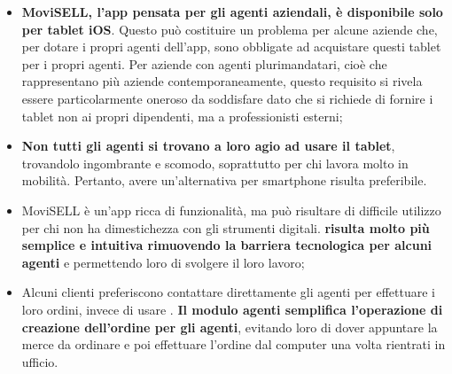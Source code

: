 \begin{itemize}
    \item \textbf{MoviSELL, l'app pensata per gli agenti aziendali, è disponibile solo per tablet iOS}. Questo può costituire un problema 
          per alcune aziende che, per dotare i propri agenti dell'app, sono obbligate ad acquistare questi tablet per i propri agenti. 
          Per aziende con agenti plurimandatari, cioè che rappresentano più aziende contemporaneamente, questo requisito si 
          rivela essere particolarmente oneroso da soddisfare dato che si richiede di fornire i tablet non ai propri dipendenti, 
          ma a professionisti esterni;
    \item \textbf{Non tutti gli agenti si trovano a loro agio ad usare il tablet}, trovandolo ingombrante e scomodo, soprattutto per chi 
          lavora molto in mobilità. Pertanto, avere un'alternativa per smartphone risulta preferibile.
    \item MoviSELL è un'app ricca di funzionalità, ma può risultare di difficile utilizzo per chi non ha dimestichezza con gli 
          strumenti digitali. \textbf{{\movi} risulta molto più semplice e intuitiva rimuovendo la barriera tecnologica per alcuni 
          agenti} e permettendo loro di svolgere il loro lavoro;
    \item Alcuni clienti preferiscono contattare direttamente gli agenti per effettuare i loro ordini, invece di usare {\movi}. 
          \textbf{Il modulo agenti semplifica l'operazione di creazione dell'ordine per gli agenti}, evitando loro di dover appuntare 
          la merce da ordinare e poi effettuare l'ordine dal computer una volta rientrati in ufficio.
\end{itemize}